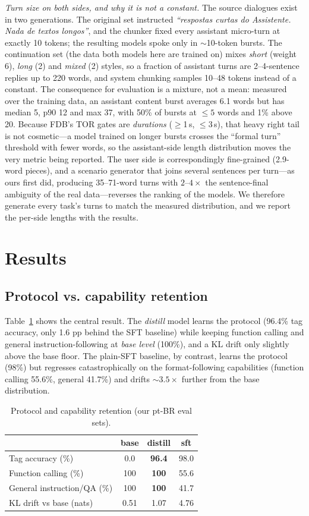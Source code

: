 \documentclass[conference]{IEEEtran}
\begin{document}
\emph{Turn size on both sides, and why it is not a constant.} The source dialogues
exist in two generations. The original set instructed \emph{``respostas curtas do
Assistente. Nada de textos longos''}, and the chunker fixed every assistant
micro-turn at exactly 10 tokens; the resulting models spoke only in $\sim$10-token
bursts. The continuation set (the data both models here are trained on) mixes
\emph{short} (weight 6), \emph{long} (2) and \emph{mixed} (2) styles, so a fraction
of assistant turns are 2--4-sentence replies up to 220 words, and system chunking
samples 10--48 tokens instead of a constant. The consequence for evaluation is a
mixture, not a mean: measured over the training data, an assistant content burst
averages 6.1 words but has median 5, p90 12 and max 37, with 50\% of bursts at
$\le5$ words and 1\% above 20. Because FDB's TOR gates are \emph{durations}
($\ge$1\,s, $\le$3\,s), that heavy right tail is not cosmetic---a model trained on
longer bursts crosses the ``formal turn'' threshold with fewer words, so the
assistant-side length distribution moves the very metric being reported. The user
side is correspondingly fine-grained (2.9-word pieces), and a scenario generator
that joins several sentences per turn---as ours first did, producing 35--71-word
turns with $2$--$4\times$ the sentence-final ambiguity of the real data---reverses
the ranking of the models. We therefore generate every task's turns to match the
measured distribution, and we report the per-side lengths with the results.

\section{Results}
\label{sec:results}
\subsection{Protocol vs. capability retention}
Table~\ref{tab:custom} shows the central result. The \emph{distill} model learns the
protocol (96.4\% tag accuracy, only 1.6 pp behind the SFT baseline) while keeping
function calling and general instruction-following at \emph{base level} (100\%), and
a KL drift only slightly above the base floor. The plain-SFT baseline, by contrast,
learns the protocol (98\%) but regresses catastrophically on the format-following
capabilities (function calling 55.6\%, general 41.7\%) and drifts ${\sim}3.5\times$
further from the base distribution.

\begin{table}[t]
\centering
\caption{Protocol and capability retention (our pt-BR eval sets).}
\label{tab:custom}
\begin{tabular}{lccc}
\toprule
 & base & \textbf{distill} & sft \\
\midrule
Tag accuracy (\%) & 0.0 & \textbf{96.4} & 98.0 \\
Function calling (\%) & 100 & \textbf{100} & 55.6 \\
General instruction/QA (\%) & 100 & \textbf{100} & 41.7 \\
KL drift vs base (nats) & 0.51 & 1.07 & 4.76 \\
\bottomrule
\end{tabular}
\end{table}
\end{document}
